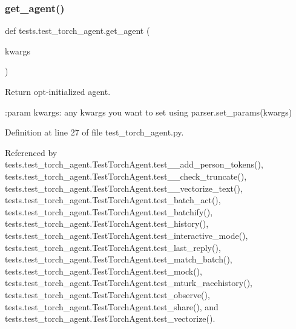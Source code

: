 \subsubsection{\texorpdfstring{get\+\_\+agent()}{get\_agent()}}
{\footnotesize\ttfamily def tests.\+test\+\_\+torch\+\_\+agent.\+get\+\_\+agent (\begin{DoxyParamCaption}\item[{}]{kwargs }\end{DoxyParamCaption})}

\begin{DoxyVerb}Return opt-initialized agent.

:param kwargs: any kwargs you want to set using parser.set_params(\*\*kwargs)
\end{DoxyVerb}
 

Definition at line 27 of file test\+\_\+torch\+\_\+agent.\+py.



Referenced by tests.\+test\+\_\+torch\+\_\+agent.\+Test\+Torch\+Agent.\+test\+\_\+\+\_\+add\+\_\+person\+\_\+tokens(), tests.\+test\+\_\+torch\+\_\+agent.\+Test\+Torch\+Agent.\+test\+\_\+\+\_\+check\+\_\+truncate(), tests.\+test\+\_\+torch\+\_\+agent.\+Test\+Torch\+Agent.\+test\+\_\+\+\_\+vectorize\+\_\+text(), tests.\+test\+\_\+torch\+\_\+agent.\+Test\+Torch\+Agent.\+test\+\_\+batch\+\_\+act(), tests.\+test\+\_\+torch\+\_\+agent.\+Test\+Torch\+Agent.\+test\+\_\+batchify(), tests.\+test\+\_\+torch\+\_\+agent.\+Test\+Torch\+Agent.\+test\+\_\+history(), tests.\+test\+\_\+torch\+\_\+agent.\+Test\+Torch\+Agent.\+test\+\_\+interactive\+\_\+mode(), tests.\+test\+\_\+torch\+\_\+agent.\+Test\+Torch\+Agent.\+test\+\_\+last\+\_\+reply(), tests.\+test\+\_\+torch\+\_\+agent.\+Test\+Torch\+Agent.\+test\+\_\+match\+\_\+batch(), tests.\+test\+\_\+torch\+\_\+agent.\+Test\+Torch\+Agent.\+test\+\_\+mock(), tests.\+test\+\_\+torch\+\_\+agent.\+Test\+Torch\+Agent.\+test\+\_\+mturk\+\_\+racehistory(), tests.\+test\+\_\+torch\+\_\+agent.\+Test\+Torch\+Agent.\+test\+\_\+observe(), tests.\+test\+\_\+torch\+\_\+agent.\+Test\+Torch\+Agent.\+test\+\_\+share(), and tests.\+test\+\_\+torch\+\_\+agent.\+Test\+Torch\+Agent.\+test\+\_\+vectorize().

